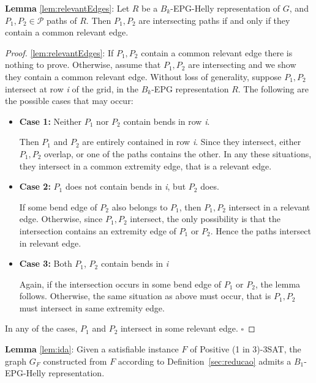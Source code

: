 \documentclass[runningheads]{llncs}
\begin{document}
\begin{lemma*}
\textbf{Lemma} \ref{lem:relevantEdges}:
Let $R$ be a $B_k$-EPG-Helly representation of $G$, and $P_1, P_2 \in \mathcal{P}$ paths of $R$. Then $P_1, P_2$ are intersecting paths if and only if they contain a common relevant edge.
\end{lemma*}


\begin{proof}
\ref{lem:relevantEdges}: If $P_1, P_2$ contain a common relevant edge there is nothing to prove. Otherwise, assume that $P_1, P_2$ are intersecting and we show they contain a common relevant edge. Without loss of generality, suppose $P_1, P_2$ intersect at row \textit{i} of the grid, in the  $B_k$-EPG representation $R$. The following are the possible cases that may occur:

\begin{itemize}
\item \textbf{Case 1:} Neither $P_1$ nor $P_2$ contain bends in row \textit{i}. 

Then $P_1$ and $ P_2$  are entirely contained in row \textit{i}. Since they intersect, either $P_1, P_2$  overlap, or one of the paths contains the other. In any these situations, they intersect in a common extremity edge, that is a relevant edge.

\item \textbf{Case 2:} $P_1$ does not contain bends in \textit{i}, but $ P_2$ does.

If some bend edge of $P_2$ also belongs to $P_1$, then $P_1, P_2$  intersect in  a relevant edge. Otherwise, since $P_1, P_2$  intersect, the only possibility is that the intersection contains an extremity edge of $P_1$ or $ P_2$. Hence the paths intersect in relevant edge.  

\item \textbf{Case 3:} Both $P_1$,  $P_2$ contain bends in \textit{i}

Again, if the intersection occurs in some bend edge of $P_1$  or $P_2$, the lemma follows. Otherwise, the same situation as above must occur, that is $P_1, P_2$  must intersect in same extremity edge.
 
\end{itemize}
In any of the cases, $P_1$ and $P_2$ intersect in some relevant edge.
$\square$ \end{proof}


\begin{lemma*}\textbf{Lemma} \ref{lem:ida}:
Given a satisfiable instance $F$ of {\sc Positive (1 in 3)-3SAT}, the graph $G_F$ constructed from $F$ according to Definition~\ref{sec:reducao} admits a $B_{1}$-EPG-Helly representation.
\end{lemma*}
\end{document}
